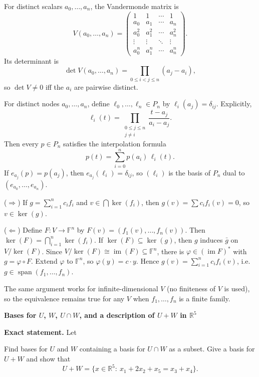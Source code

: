 \begin{problem}[CP-I-0087]
For distinct scalars \(a_0,\dots,a_n\), the Vandermonde matrix is
\[
V(a_0,\dots,a_n)=
\begin{pmatrix}
	1 & 1 & \cdots & 1\\
	a_0 & a_1 & \cdots & a_n\\
	a_0^2 & a_1^2 & \cdots & a_n^2\\
	\vdots & \vdots & \ddots & \vdots\\
	a_0^n & a_1^n & \cdots & a_n^n
\end{pmatrix}.
\]
Its determinant is
\[
\det V(a_0,\dots,a_n)=\prod_{0\le i<j\le n}(a_j-a_i),
\]
so \(\det V\neq 0\) iff the \(a_i\) are pairwise distinct.

For distinct nodes \(a_0,\dots,a_n\), define \(\ell_0,\dots,\ell_n\in P_n\) by
\(\ell_i(a_j)=\delta_{ij}\). Explicitly,
\[
\ell_i(t)=\prod_{\substack{0\le j\le n\\ j\ne i}}\frac{t-a_j}{a_i-a_j}.
\]
Then every \(p\in P_n\) satisfies the interpolation formula
\[
p(t)=\sum_{i=0}^n p(a_i)\,\ell_i(t).
\]
If \(e_{a_j}(p)=p(a_j)\), then \(e_{a_j}(\ell_i)=\delta_{ij}\), so \((\ell_i)\) is the basis of \(P_n\) dual to
\((e_{a_0},\dots,e_{a_n})\).\end{problem}

\begin{solution}
(\(\Rightarrow\)) If \(g=\sum_{i=1}^n c_i f_i\) and \(v\in\bigcap \ker(f_i)\), then \(g(v)=\sum c_i f_i(v)=0\), so \(v\in\ker(g)\).

(\(\Leftarrow\)) Define \(F:V\to\mathbb F^n\) by \(F(v)=(f_1(v),\dots,f_n(v))\). Then \(\ker(F)=\bigcap_{i=1}^n\ker(f_i)\).
If \(\ker(F)\subseteq\ker(g)\), then \(g\) induces \(\bar g\) on \(V/\ker(F)\). Since \(V/\ker(F)\cong \operatorname{im}(F)\subseteq\mathbb F^n\),
there is \(\varphi\in(\operatorname{im}F)^*\) with \(g=\varphi\circ F\). Extend \(\varphi\) to \(\mathbb F^n\), so \(\varphi(y)=c\cdot y\).
Hence \(g(v)=\sum_{i=1}^n c_i f_i(v)\), i.e. \(g\in\operatorname{span}(f_1,\dots,f_n)\).

The same argument works for infinite-dimensional \(V\) (no finiteness of \(V\) is used), so the equivalence remains true for any \(V\) when
\(f_1,\dots,f_n\) is a finite family.
\end{solution}

\begin{problem}[CP-I-0090]
\label{prob:cp-i-0090}
\textbf{Bases for $U$, $W$, $U\cap W$, and a description of $U+W$ in $\mathbb R^5$}

\textbf{Exact statement.}
\hspace*{1.5em}Let
\begin{center}
\end{center}
Find bases for $U$ and $W$ containing a basis for $U\cap W$ as a subset.
Give a basis for $U+W$ and show that
\[
U+W=\{x\in\mathbb R^5:\ x_1+2x_2+x_5=x_3+x_4\}.
\]
\end{problem}

